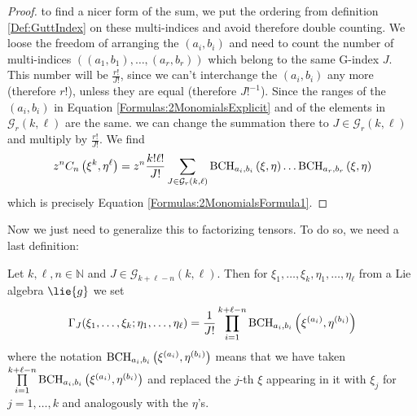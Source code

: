 \begin{proof}
    to find a nicer form of the sum, we put the ordering from definition 
    \ref{Def:GuttIndex} on these multi-indices and avoid therefore double 
    counting. We loose the freedom of arranging the $(a_i, b_i)$ and 
    need to count the number of multi-indices $((a_1, b_1), \ldots, 
    (a_r, b_r))$ which belong to the same G-index $J$. This number will 
    be $\frac{r!}{J!}$, since we can't interchange the $(a_i, b_i)$ any 
    more (therefore $r!$), unless they are equal (therefore $J!^{-1}$). 
    Since the ranges of the $(a_i, b_i)$ in Equation 
    \eqref{Formulas:2MonomialsExplicit} and of  the elements in 
    $\mathcal{G}_r(k, \ell)$ are the same. we can change the summation there 
    to $J \in \mathcal{G}_r(k, \ell)$ and multiply by $\frac{r!}{J!}$. We 
    find
    \begin{equation*}
    	z^n C_n \left( \xi^k, \eta^{\ell} \right)
    	=
    	z^n \frac{k! \ell!}{J!}
    	\sum\limits_{J \in \mathcal{G}_r(k, \ell)}
    	\mathrm{BCH}_{a_i, b_i}\left(\xi, \eta\right)
        \ldots
        \mathrm{BCH}_{a_r, b_r}\left(\xi, \eta\right)
    \end{equation*}
    which is precisely Equation \eqref{Formulas:2MonomialsFormula1}.
\end{proof}
Now we just need to generalize this to factorizing tensors. To do so, we 
need a last definition:
\begin{definition}
	\label{Def:GuttInsert}
	Let $k, \ell, n \in \mathbb{N}$ and $J \in \mathcal{G}_{k + \ell - 
	n}(k, \ell)$. Then for $\xi_1, \ldots, \xi_k, \eta_1, \ldots, 
	\eta_{\ell}$ from a Lie algebra $\lie{g}$ we set
	\begin{equation}
		\label{Formulas:GuttInsert}
		\Gamma_J(\xi_1, \ldots, \xi_k; \eta_1, \ldots, \eta_{\ell})
		=
		\frac{1}{J!}
		\prod\limits_{i=1}^{k + \ell - n}
		\mathrm{BCH}_{a_i, b_i}\left(\xi^{(a_i)}, \eta^{(b_i)}\right)
	\end{equation}
	where the notation $\mathrm{BCH}_{a_i, b_i}\left(\xi^{(a_i)}, \eta^{(b_i)}\right)$ 
	means that we have taken $\prod\limits_{i=1}^{k + \ell - n} 
	\mathrm{BCH}_{a_i, b_i}\left(\xi^{(a_i)}, \eta^{(b_i)}\right)$ and replaced the 
	$j$-th $\xi$ appearing in it with $\xi_j$ for $j = 1, \ldots, k$ and 
	analogously with the $\eta$'s.
\end{definition}
